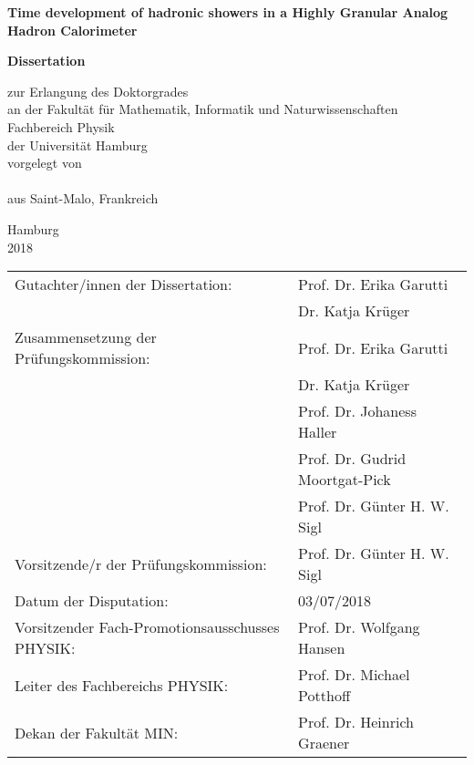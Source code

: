 \begin{titlepage}

  \thispagestyle{empty}
  \begin{center}

    {\huge \bf Time development of hadronic showers in a Highly Granular Analog Hadron Calorimeter\\}

    \vspace{3cm}

    {\LARGE \bf Dissertation\\}

    \vspace{0.5cm}
    {\Large
    zur Erlangung des Doktorgrades\\
    an der Fakult\"{a}t f\"ur Mathematik, Informatik und Naturwissenschaften\\
    Fachbereich Physik\\
    der Universit\"{a}t Hamburg\\
    \vspace{2.5cm}
    vorgelegt von\\
    \makeatletter
    \textsc{\@author}\\
    \makeatother
    aus Saint-Malo, Frankreich\\

    \vfill

    Hamburg\\
    2018\\
    }

    \newpage
    \thispagestyle{empty}
    \null
    \vfill
    \begin{tabular}{ll}
      Gutachter/innen der Dissertation: & Prof. Dr. Erika Garutti\\
      & Dr. Katja Kr\"uger\\[3mm]
      Zusammensetzung der Pr\"ufungskommission: & Prof. Dr. Erika Garutti\\
      & Dr. Katja Kr\"uger\\
      & Prof. Dr. Johaness Haller\\
      & Prof. Dr. Gudrid Moortgat-Pick\\
      & Prof. Dr. G\"unter H. W. Sigl\\[3mm]
      Vorsitzende/r der Pr\"ufungskommission: & Prof. Dr. G\"unter H. W. Sigl\\[3mm]
      Datum der Disputation: & 03/07/2018\\[3mm]
      Vorsitzender Fach-Promotionsausschusses PHYSIK: & Prof. Dr. Wolfgang Hansen\\[3mm]
      Leiter des Fachbereichs PHYSIK: & Prof. Dr. Michael Potthoff\\[3mm]
      Dekan der Fakult\"at MIN: & Prof. Dr. Heinrich Graener\\[3mm]
    \end{tabular}

  \end{center}
\end{titlepage}
